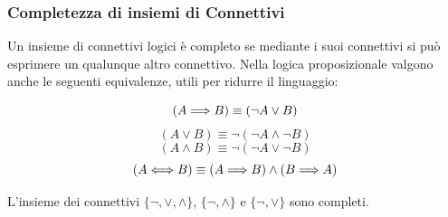 \documentclass[a4paper,12pt, oneside]{book}
\begin{document}
\subsubsection{Completezza di insiemi di Connettivi}
Un insieme di connettivi logici è completo se mediante i suoi connettivi si può
esprimere un qualunque altro connettivo.
Nella logica proposizionale valgono anche le seguenti equivalenze, utili per
ridurre il linguaggio: 

\[(A {\implies} B)  \equiv  (\neg A \lor B) \]
\[(A \lor B)  \equiv  \neg(\neg A \land \neg B) \]
\[(A \land B)  \equiv  \neg(\neg A \lor \neg B) \]
\[(A {\iff} B) \equiv  (A {\implies} B) \land (B {\implies} A) \]

L'insieme dei connettivi $\{ \neg,\lor,\land \}$, $\{ \neg,\land \}$ e $\{
\neg,\lor \}$ sono completi.
\end{document}
